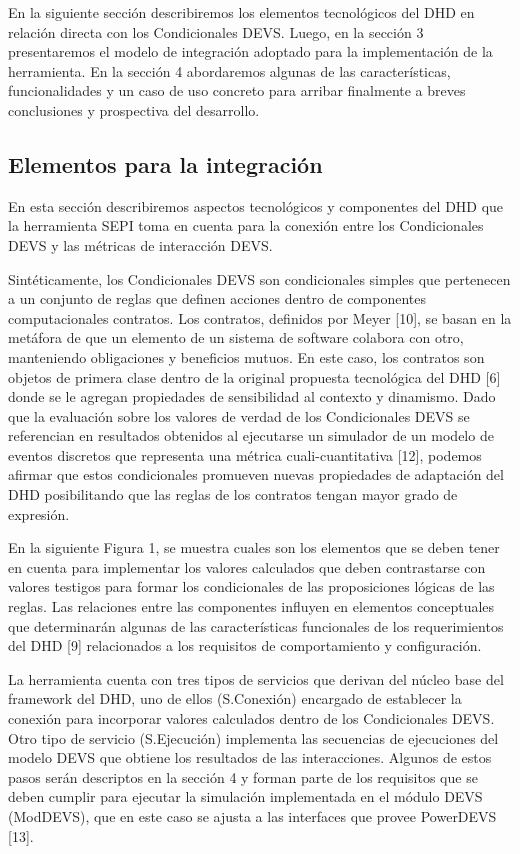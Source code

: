 En la siguiente sección describiremos los elementos tecnológicos del DHD en
relación directa con los Condicionales DEVS.  Luego, en la sección 3
presentaremos el modelo de integración adoptado para la implementación de la
herramienta. En la sección 4 abordaremos algunas de las características,
funcionalidades y un caso de uso concreto para arribar finalmente a breves
conclusiones y prospectiva del desarrollo.


\subsection{Elementos para la integración}

En esta sección describiremos aspectos tecnológicos y componentes del DHD que la
herramienta SEPI toma en cuenta para la conexión entre los Condicionales DEVS y
las métricas de interacción DEVS. 

Sintéticamente, los Condicionales DEVS son condicionales simples que pertenecen
a un conjunto de reglas que definen acciones dentro de componentes
computacionales contratos. Los contratos, definidos por  Meyer [10], se basan en
la metáfora de que un elemento de un sistema de software colabora con otro,
manteniendo obligaciones y beneficios mutuos. En este caso, los contratos son
objetos de primera clase dentro de la original propuesta tecnológica del DHD [6]
donde se le agregan propiedades de sensibilidad al contexto y dinamismo. 
Dado que la evaluación sobre los valores de verdad de los Condicionales DEVS se
referencian en resultados obtenidos al ejecutarse un simulador de un modelo de
eventos discretos que representa una métrica cuali-cuantitativa [12], podemos
afirmar que estos condicionales promueven nuevas propiedades de adaptación del
DHD posibilitando que las reglas de los contratos tengan mayor grado de
expresión. 

En la siguiente Figura 1, se muestra cuales son los elementos que se deben tener
en cuenta para implementar los valores calculados que deben contrastarse con
valores testigos para formar los condicionales de las proposiciones lógicas de
las reglas.  Las  relaciones entre las componentes influyen en elementos
conceptuales que determinarán algunas de las características funcionales de los
requerimientos del DHD [9] relacionados a los requisitos de comportamiento y
configuración.

La herramienta cuenta con tres tipos de servicios que derivan del núcleo base
del framework del DHD, uno de ellos (S.Conexión) encargado de establecer la
conexión para incorporar valores calculados dentro de los Condicionales DEVS.
Otro tipo de servicio (S.Ejecución) implementa las secuencias de ejecuciones del
modelo DEVS  que obtiene los resultados de las interacciones. Algunos de estos
pasos serán descriptos en la sección 4 y forman parte de los requisitos que se
deben cumplir para ejecutar la simulación implementada en el módulo DEVS
(ModDEVS), que en este caso se ajusta a las interfaces que provee PowerDEVS
[13].

